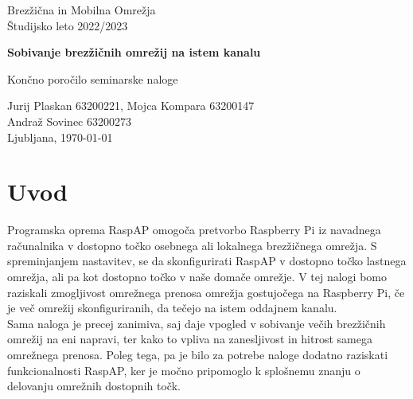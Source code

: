 \documentclass[11pt,a4paper,slovene]{article}
\begin{document}
\label{naslov}
\thispagestyle{empty}

\begin{center}
\begin{Large}
Brezžična in Mobilna Omrežja\\
Študijsko leto 2022/2023\\
\end{Large}

\vspace*{4cm}
\begin{LARGE}
\textbf{Sobivanje brezžičnih omrežij na istem kanalu\\}
\end{LARGE}
\vspace*{0.5cm}

\begin{Large}
Končno poročilo seminarske naloge\\

\vspace*{4cm}

Jurij Plaskan 63200221, Mojca Kompara 63200147\\
Andraž Sovinec 63200273\\

\vspace*{5cm}
Ljubljana, \today
\end{Large}
\end{center}

\pagebreak
\setcounter{page}{1}


\label{Kazalo}
\tableofcontents
\thispagestyle{empty}
\pagebreak

\section{Uvod}
Programska oprema RaspAP omogoča pretvorbo Raspberry Pi iz navadnega računalnika v dostopno točko osebnega ali lokalnega brezžičnega omrežja. S spreminjanjem nastavitev, se da skonfigurirati RaspAP v dostopno točko lastnega omrežja, ali pa kot dostopno točko v naše domače omrežje. V tej nalogi bomo raziskali zmogljivost omrežnega prenosa omrežja gostujočega na Raspberry Pi, če je več omrežij skonfiguriranih, da tečejo na istem oddajnem kanalu.\\
Sama naloga je precej zanimiva, saj daje vpogled v sobivanje večih brezžičnih omrežij na eni napravi, ter kako to vpliva na zanesljivost in hitrost samega omrežnega prenosa. Poleg tega, pa je bilo za potrebe naloge dodatno raziskati funkcionalnosti RaspAP, ker je močno pripomoglo k splošnemu znanju o delovanju omrežnih dostopnih točk.
\end{document}
